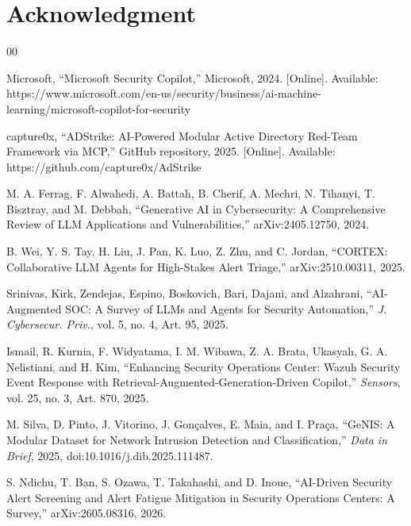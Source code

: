 \documentclass[conference]{IEEEtran}
\begin{document}
\section*{Acknowledgment}

\begin{thebibliography}{00}

 Microsoft, ``Microsoft Security Copilot,'' Microsoft, 2024. [Online].
Available: https://www.microsoft.com/en-us/security/business/ai-machine-learning/microsoft-copilot-for-security

 capture0x, ``ADStrike: AI-Powered Modular Active Directory Red-Team
Framework via MCP,'' GitHub repository, 2025. [Online]. Available:
https://github.com/capture0x/AdStrike

 M. A. Ferrag, F. Alwahedi, A. Battah, B. Cherif, A. Mechri, N. Tihanyi,
T. Bisztray, and M. Debbah, ``Generative AI in Cybersecurity: A Comprehensive Review of LLM
Applications and Vulnerabilities,'' arXiv:2405.12750, 2024.

 B. Wei, Y. S. Tay, H. Liu, J. Pan, K. Luo, Z. Zhu, and C. Jordan, ``CORTEX:
Collaborative LLM Agents for High-Stakes Alert Triage,'' arXiv:2510.00311, 2025.

 Srinivas, Kirk, Zendejas, Espino, Boskovich, Bari, Dajani, and
Alzahrani, ``AI-Augmented SOC: A Survey of LLMs and Agents for Security Automation,'' \emph{J.
Cybersecur. Priv.}, vol. 5, no. 4, Art. 95, 2025.

 Ismail, R. Kurnia, F. Widyatama, I. M. Wibawa, Z. A. Brata, Ukasyah, G. A.
Nelistiani, and H. Kim, ``Enhancing Security Operations Center: Wazuh Security Event Response with
Retrieval-Augmented-Generation-Driven Copilot,'' \emph{Sensors}, vol. 25, no. 3, Art. 870, 2025.

 M. Silva, D. Pinto, J. Vitorino, J. Gon\c{c}alves, E. Maia, and I. Pra\c{c}a,
``GeNIS: A Modular Dataset for Network Intrusion Detection and Classification,'' \emph{Data in
Brief}, 2025, doi:10.1016/j.dib.2025.111487.

 S. Ndichu, T. Ban, S. Ozawa, T. Takahashi, and D. Inoue, ``AI-Driven
Security Alert Screening and Alert Fatigue Mitigation in Security Operations Centers: A
Survey,'' arXiv:2605.08316, 2026.


\end{thebibliography}
\end{document}
